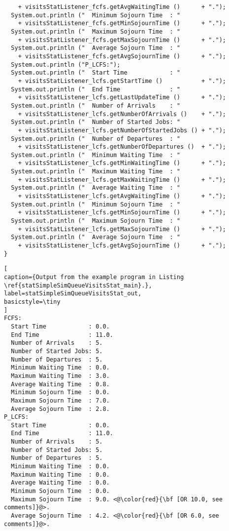 \documentclass[12pt]{book}
\begin{document}
\begin{lstlisting}
    + visitsStatListener_fcfs.getAvgWaitingTime ()      + ".");
  System.out.println ("  Minimum Sojourn Time  : "
    + visitsStatListener_fcfs.getMinSojournTime ()      + ".");
  System.out.println ("  Maximum Sojourn Time  : "
    + visitsStatListener_fcfs.getMaxSojournTime ()      + ".");
  System.out.println ("  Average Sojourn Time  : "
    + visitsStatListener_fcfs.getAvgSojournTime ()      + ".");
  System.out.println ("P_LCFS:");
  System.out.println ("  Start Time            : "
    + visitsStatListener_lcfs.getStartTime ()           + ".");
  System.out.println ("  End Time              : "
    + visitsStatListener_lcfs.getLastUpdateTime ()      + ".");
  System.out.println ("  Number of Arrivals    : "
    + visitsStatListener_lcfs.getNumberOfArrivals ()    + ".");
  System.out.println ("  Number of Started Jobs: "
    + visitsStatListener_lcfs.getNumberOfStartedJobs () + ".");
  System.out.println ("  Number of Departures  : "
    + visitsStatListener_lcfs.getNumberOfDepartures ()  + ".");
  System.out.println ("  Minimum Waiting Time  : "
    + visitsStatListener_lcfs.getMinWaitingTime ()      + ".");
  System.out.println ("  Maximum Waiting Time  : "
    + visitsStatListener_lcfs.getMaxWaitingTime ()      + ".");
  System.out.println ("  Average Waiting Time  : "
    + visitsStatListener_lcfs.getAvgWaitingTime ()      + ".");
  System.out.println ("  Minimum Sojourn Time  : "
    + visitsStatListener_lcfs.getMinSojournTime ()      + ".");
  System.out.println ("  Maximum Sojourn Time  : "
    + visitsStatListener_lcfs.getMaxSojournTime ()      + ".");
  System.out.println ("  Average Sojourn Time  : "
    + visitsStatListener_lcfs.getAvgSojournTime ()      + ".");
}
\end{lstlisting}

\begin{lstlisting}[
caption={Output from the example program in Listing \ref{statSimpleSimQueueVisitsStat_main}.},
label=statSimpleSimQueueVisitsStat_out,
basicstyle=\tiny
]
FCFS:
  Start Time            : 0.0.
  End Time              : 11.0.
  Number of Arrivals    : 5.
  Number of Started Jobs: 5.
  Number of Departures  : 5.
  Minimum Waiting Time  : 0.0.
  Maximum Waiting Time  : 3.0.
  Average Waiting Time  : 0.8.
  Minimum Sojourn Time  : 0.0.
  Maximum Sojourn Time  : 7.0.
  Average Sojourn Time  : 2.8.
P_LCFS:
  Start Time            : 0.0.
  End Time              : 11.0.
  Number of Arrivals    : 5.
  Number of Started Jobs: 5.
  Number of Departures  : 5.
  Minimum Waiting Time  : 0.0.
  Maximum Waiting Time  : 0.0.
  Average Waiting Time  : 0.0.
  Minimum Sojourn Time  : 0.0.
  Maximum Sojourn Time  : 9.0. <@\color{red}{\bf [OR 10.0, see comments]}@>.
  Average Sojourn Time  : 4.2. <@\color{red}{\bf [OR 6.0, see comments]}@>.
\end{lstlisting}
\end{document}
